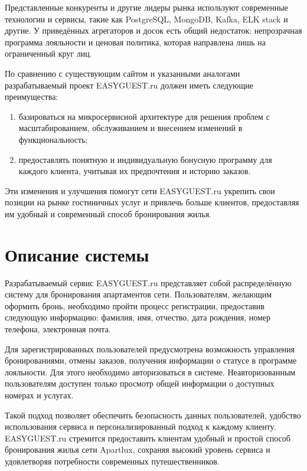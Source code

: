  Представленные конкуренты и другие лидеры рынка используют современные технологии и сервисы, такие как PostgreSQL, MongoDB, Kafka, ELK stack и другие. У приведённых агрегаторов и досок есть общий недостаток: непрозрачная программа лояльности и ценовая политика, которая направлена лишь на ограниченный круг лиц.

По сравнению с существующим сайтом и указанными аналогами разрабатываемый проект EASYGUEST.ru должен иметь следующие преимущества:
\begin{enumerate}
  \item базироваться на микросервисной архитектуре для решения проблем с масштабированием, обслуживанием и внесением изменений в функциональность;
  
  \item предоставлять понятную и индивидуальную бонусную программу для каждого клиента, учитывая их предпочтения и историю заказов.
\end{enumerate}

Эти изменения и улучшения помогут сети EASYGUEST.ru укрепить свои позиции на рынке гостиничных услуг и привлечь больше клиентов, предоставляя им удобный и современный способ бронирования жилья.

\section*{Описание системы}
Разрабатываемый сервис EASYGUEST.ru представляет собой распределённую систему для бронирования апартаментов сети. Пользователям, желающим оформить бронь, необходимо пройти процесс регистрации, предоставив следующую информацию: фамилия, имя, отчество, дата рождения, номер телефона, электронная почта. 

Для зарегистрированных пользователей предусмотрена возможность управления бронированиями, отмены заказов, получения информации о статусе в программе лояльности. Для этого необходимо авторизоваться в системе. Неавторизованным пользователям доступен только просмотр общей информации о доступных номерах и услугах.

Такой подход позволяет обеспечить безопасность данных пользователей, удобство использования сервиса и персонализированный подход к каждому клиенту. EASYGUEST.ru стремится предоставить клиентам удобный и простой способ бронирования жилья сети Apartlux, сохраняя высокий уровень сервиса и удовлетворяя потребности современных путешественников. 

